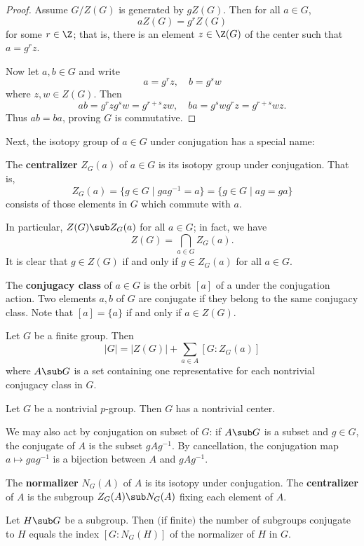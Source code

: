 \begin{proof}
Assume $G/Z(G)$ is generated by $gZ(G)$. Then for all $a\in G$,
\[aZ(G)=g^rZ(G)\]
for some $r\in\Z$; that is, there is an element $z\in\Z(G)$ of the center such that $a=g^rz$.\par
Now let $a,b\in G$ and write
\[a=g^rz,\quad b=g^sw\]
where $z,w\in Z(G)$. Then
\[ab=g^{r}zg^sw=g^{r+s}zw,\quad ba=g^swg^rz=g^{r+s}wz.\]
Thus $ab=ba$, proving $G$ is commutative.
\end{proof}
Next, the isotopy group of $a\in G$ under conjugation has a special name:
\begin{definition}
The \textbf{centralizer} $Z_G(a)$ of $a\in G$ is its isotopy group under conjugation. That is,
\[Z_G(a)=\{g\in G\mid gag^{-1}=a\}=\{g\in G\mid ag=ga\}\]
consists of those elements in $G$ which commute with $a$.
\end{definition}
In particular, $Z(G)\sub Z_G(a)$ for all $a\in G$; in fact, we have
\[Z(G)=\bigcap_{a\in G}Z_G(a).\]
It is clear that $g\in Z(G)$ if and only if $g\in Z_G(a)$ for all $a\in G$.
\begin{definition}
The \textbf{conjugacy class} of $a\in G$ is the orbit $[a]$ of a under the
conjugation action. Two elements $a,b$ of $G$ are conjugate if they belong to the same conjugacy class. Note that $[a]=\{a\}$ if and only if $a\in Z(G)$.
\end{definition}
\begin{proposition}\label{class formula}
Let $G$ be a finite group. Then
\[|G|=|Z(G)|+\sum_{a\in A}[G:Z_G(a)]\]
where $A\sub G$ is a set containing one representative for each nontrivial conjugacy class in $G$.
\end{proposition}
\begin{corollary}
Let $G$ be a nontrivial $p$-group. Then $G$ has a nontrivial center.
\end{corollary}
We may also act by conjugation on subset of $G$: if $A\sub G$ is a subset and $g\in G$, the conjugate of $A$ is the subset $gAg^{-1}$. By cancellation, the conjugation map $a\mapsto gag^{-1}$ is a bijection between $A$ and $gAg^{-1}$.\par
\begin{definition}
The \textbf{normalizer} $N_G(A)$ of $A$ is its isotopy under conjugation. The \textbf{centralizer} of $A$ is the subgroup $Z_G(A)\sub N_G(A)$ fixing each element of $A$.
\end{definition}
\begin{proposition}\label{conjugate subgroup number}
Let $H\sub G$ be a subgroup. Then $($if finite$)$ the number of subgroups
conjugate to $H$ equals the index $[G:N_G(H)]$ of the normalizer of $H$ in $G$.
\end{proposition}
